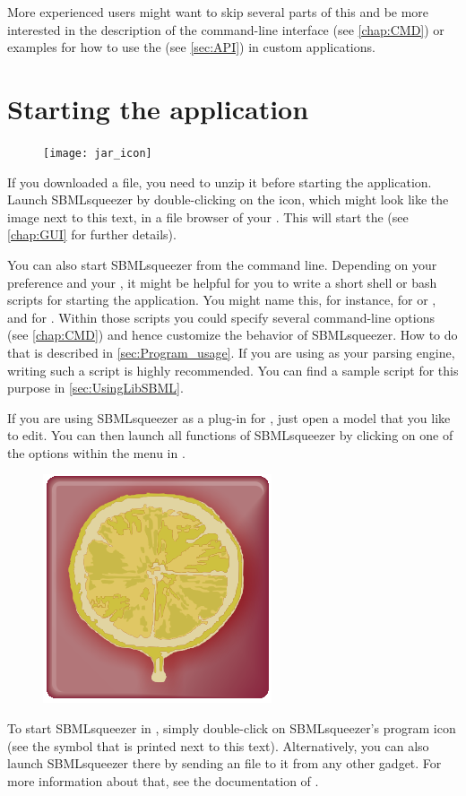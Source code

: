 More experienced users might want to skip several parts of this  and be more interested in the description of the command-line interface (see \vref{chap:CMD}) or examples for how to use the \API (see \vref{sec:API}) in custom applications.

\section{Starting the application}
\label{startingTheProgram}

\begin{figure}
\vspace{\wrapfigspace}
\texttt{[image: jar\_icon]}
\end{figure}
If you downloaded a \ZIP file, you need to unzip it before starting the application.
Launch SBMLsqueezer by double-clicking on the \Java icon, which might look like the
image next to this text, in a file browser of your \OS.
This will start the \GUI (see \vref{chap:GUI} for further details).

You can also start SBMLsqueezer from the command line.
Depending on your preference and your \OS, it might be helpful for
you to write a short shell or bash scripts for starting the application.
You might name this, for instance,  for \Linux or \MacOSX, and
 for \Windows. Within those scripts you could specify several
command-line options (see \vref{chap:CMD}) and hence customize the behavior of SBMLsqueezer.
How to do that is described in \vref{sec:Program_usage}.
If you are using \libSBML as your \SBML parsing engine, writing such a script is highly recommended.
You can find a sample script for this purpose in \vref{sec:UsingLibSBML}.

If you are using SBMLsqueezer as a plug-in for \CellDesigner, just open a model that you like to edit.
You can then launch all functions of SBMLsqueezer by clicking on one of the options within the menu
 in \CellDesigner.

\begin{figure}
\vspace{\wrapfigspace}
\includegraphics[width=.8cm]{img/LOGO}
\end{figure}
\noindent To start SBMLsqueezer in \Garuda, simply double-click on SBMLsqueezer's program icon (see the symbol that is printed next to this text).
Alternatively, you can also launch SBMLsqueezer there by sending an \SBML file to it from any other \Garuda gadget.
For more information about that, see the documentation of \Garuda.

